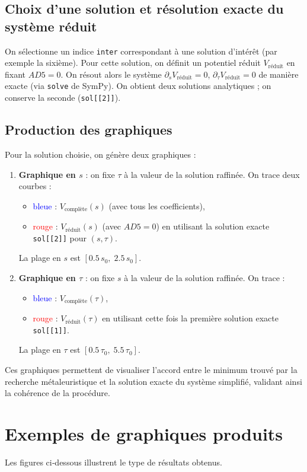\documentclass[a4paper,12pt]{article}
\begin{document}
\subsection{Choix d'une solution et résolution exacte du système réduit}
On sélectionne un indice \texttt{inter} correspondant à une solution d'intérêt (par exemple la sixième). Pour cette solution, on définit un potentiel réduit $V_{\text{réduit}}$ en fixant $AD5 = 0$. On résout alors le système $\partial_s V_{\text{réduit}} = 0$, $\partial_\tau V_{\text{réduit}} = 0$ de manière exacte (via \texttt{solve} de SymPy). On obtient deux solutions analytiques ; on conserve la seconde (\texttt{sol[[2]]}).

\subsection{Production des graphiques}
Pour la solution choisie, on génère deux graphiques :
\begin{enumerate}
    \item \textbf{Graphique en $s$} : on fixe $\tau$ à la valeur de la solution raffinée. On trace deux courbes :
    \begin{itemize}
        \item \textcolor{blue}{bleue} : $V_{\text{complète}}(s)$ (avec tous les coefficients),
        \item \textcolor{red}{rouge} : $V_{\text{réduit}}(s)$ (avec $AD5=0$) en utilisant la solution exacte \texttt{sol[[2]]} pour $(s,\tau)$.
    \end{itemize}
    La plage en $s$ est $[0.5\,s_0,\;2.5\,s_0]$.
    \item \textbf{Graphique en $\tau$} : on fixe $s$ à la valeur de la solution raffinée. On trace :
    \begin{itemize}
        \item \textcolor{blue}{bleue} : $V_{\text{complète}}(\tau)$,
        \item \textcolor{red}{rouge} : $V_{\text{réduit}}(\tau)$ en utilisant cette fois la première solution exacte \texttt{sol[[1]]}.
    \end{itemize}
    La plage en $\tau$ est $[0.5\,\tau_0,\;5.5\,\tau_0]$.
\end{enumerate}
Ces graphiques permettent de visualiser l'accord entre le minimum trouvé par la recherche métaleuristique et la solution exacte du système simplifié, validant ainsi la cohérence de la procédure.

\section{Exemples de graphiques produits}
Les figures ci‑dessous illustrent le type de résultats obtenus.
\end{document}
